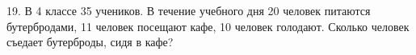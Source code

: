 19. В 4 классе 35 учеников. В течение учебного дня 20 человек питаются бутербродами, 11 человек посещают кафе, 10 человек голодают. Сколько человек съедает бутерброды, сидя в кафе?\\
